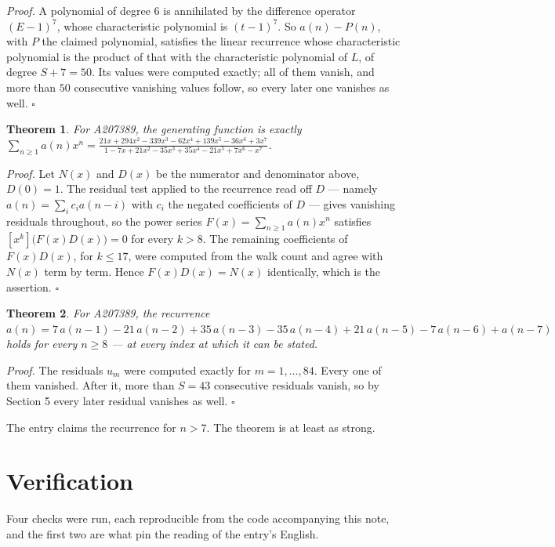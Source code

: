 \documentclass[11pt]{article}
\newtheorem{theorem}{Theorem}
\theoremstyle{definition}
\begin{document}
{\itshape Proof.} A polynomial of degree $6$ is annihilated by the difference operator $(E-1)^{7}$, whose characteristic polynomial is $(t-1)^{7}$. So $a(n) - P(n)$, with $P$ the claimed polynomial, satisfies the linear recurrence whose characteristic polynomial is the product of that with the characteristic polynomial of $L$, of degree $S + 7 = 50$. Its values were computed exactly; all of them vanish, and more than $50$ consecutive vanishing values follow, so every later one vanishes as well. $\square$

\begin{theorem} For A207389, the generating function is exactly $\sum_{n\ge 1} a(n)x^n = \frac{21x + 294x^{2} - 339x^{3} - 62x^{4} + 139x^{5} - 36x^{6} + 3x^{7}}{1 - 7x + 21x^{2} - 35x^{3} + 35x^{4} - 21x^{5} + 7x^{6} - x^{7}}$.\end{theorem}

{\itshape Proof.} Let $N(x)$ and $D(x)$ be the numerator and denominator above, $D(0)=1$. The residual test applied to the recurrence read off $D$ --- namely $a(n) = \sum_i c_i a(n-i)$ with $c_i$ the negated coefficients of $D$ --- gives vanishing residuals throughout, so the power series $F(x)=\sum_{n\ge 1}a(n)x^n$ satisfies $[x^k]\bigl(F(x)D(x)\bigr) = 0$ for every $k > 8$. The remaining coefficients of $F(x)D(x)$, for $k \le 17$, were computed from the walk count and agree with $N(x)$ term by term. Hence $F(x)D(x) = N(x)$ identically, which is the assertion. $\square$

\begin{theorem} For A207389, the recurrence $a(n) = 7\,a(n-1) - 21\,a(n-2) + 35\,a(n-3) - 35\,a(n-4) + 21\,a(n-5) - 7\,a(n-6) + a(n-7)$ holds for every $n \ge 8$ --- at every index at which it can be stated.\end{theorem}

{\itshape Proof.} The residuals $u_m$ were computed exactly for $m = 1,\dots,84$. Every one of them vanished. After it, more than $S = 43$ consecutive residuals vanish, so by Section 5 every later residual vanishes as well. $\square$

The entry claims the recurrence for $n > 7$. The theorem is at least as strong.

\section{Verification}

Four checks were run, each reproducible from the code accompanying this note, and the first two are what pin the reading of the entry's English.
\end{document}
